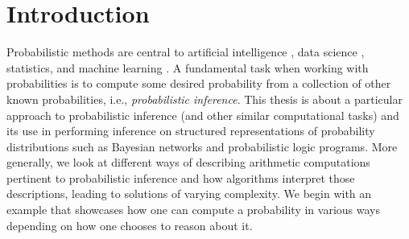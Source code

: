 


\chapter{Introduction}\label{chapter:introduction}





Probabilistic methods are central to artificial intelligence
\citep{DBLP:books/aw/RN2020}, data science \citep{provost2013data}, statistics,
and machine learning \citep{DBLP:books/lib/Bishop07,DBLP:books/daglib/0023091}.
A fundamental task when working with probabilities is to compute some desired
probability from a collection of other known probabilities, i.e.,
\emph{probabilistic inference}. This thesis is about a particular approach to
probabilistic inference (and other similar computational tasks) and its use in
performing inference on structured representations of probability distributions
such as Bayesian networks and probabilistic logic programs. More generally, we
look at different ways of describing arithmetic computations pertinent to
probabilistic inference and how algorithms interpret those descriptions, leading
to solutions of varying complexity. We begin with an example that showcases how
one can compute a probability in various ways depending on how one chooses to
reason about it.

